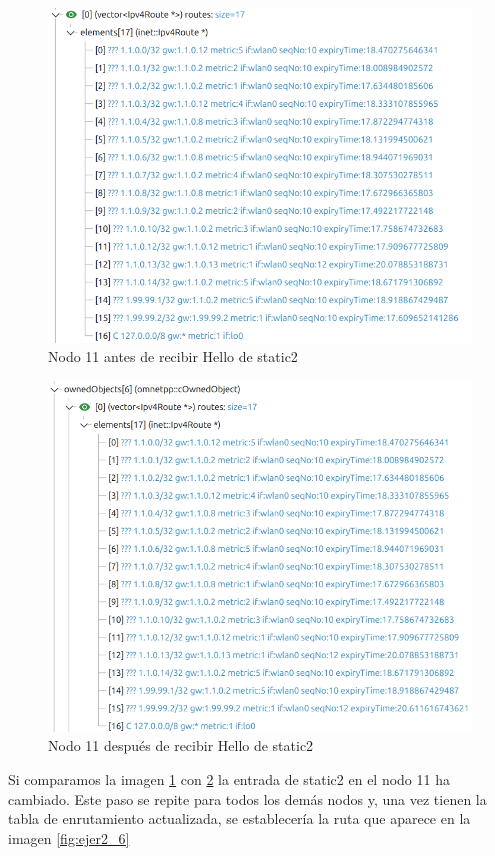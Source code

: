 \begin{figure}[H]
    \centering
    \includegraphics[width=115mm, scale=0.75]{imaxes/dsdv/ejercicio2_6_2.png}
    \caption{Nodo 11 antes de recibir Hello de static2}
    \label{fig:ejer2_6_2}
\end{figure}

\begin{figure}[H]
    \centering
    \includegraphics[width=115mm, scale=0.75]{imaxes/dsdv/ejercicio2_6_3.png}
    \caption{Nodo 11 después de recibir Hello de static2}
    \label{fig:ejer2_6_3}
\end{figure}

Si comparamos la imagen \ref{fig:ejer2_6_2} con \ref{fig:ejer2_6_3} la entrada de static2 en el nodo 11 ha cambiado. Este paso se repite para todos los demás nodos y, una vez tienen la tabla de enrutamiento actualizada, se establecería la ruta que aparece en la imagen \ref{fig:ejer2_6}

